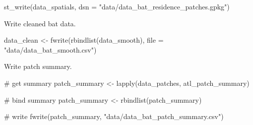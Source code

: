\documentclass[]{scrreprt}
\newenvironment{Shaded}{}{}
\newcommand{\CommentTok}[1]{\textcolor[rgb]{0.00,0.50,0.00}{#1}}
\newcommand{\DataTypeTok}[1]{#1}
\newcommand{\KeywordTok}[1]{\textcolor[rgb]{0.00,0.00,1.00}{#1}}
\newcommand{\NormalTok}[1]{#1}
\newcommand{\StringTok}[1]{\textcolor[rgb]{0.00,0.50,0.50}{#1}}
\begin{document}
\begin{Shaded}
\begin{Highlighting}[]
\KeywordTok{st_write}\NormalTok{(data_spatials,}
         \DataTypeTok{dsn =} \StringTok{"data/data_bat_residence_patches.gpkg"}\NormalTok{)}
\end{Highlighting}
\end{Shaded}

Write cleaned bat data.

\begin{Shaded}
\begin{Highlighting}[]
\NormalTok{data_clean <-}\StringTok{ }\KeywordTok{fwrite}\NormalTok{(}\KeywordTok{rbindlist}\NormalTok{(data_smooth),}
                     \DataTypeTok{file =} \StringTok{"data/data_bat_smooth.csv"}\NormalTok{)}
\end{Highlighting}
\end{Shaded}

Write patch summary.

\begin{Shaded}
\begin{Highlighting}[]
\CommentTok{# get summary}
\NormalTok{patch_summary <-}\StringTok{ }\KeywordTok{lapply}\NormalTok{(data_patches, atl_patch_summary)}

\CommentTok{# bind summary}
\NormalTok{patch_summary <-}\StringTok{ }\KeywordTok{rbindlist}\NormalTok{(patch_summary)}

\CommentTok{# write}
\KeywordTok{fwrite}\NormalTok{(patch_summary,}
       \StringTok{"data/data_bat_patch_summary.csv"}\NormalTok{)}
\end{Highlighting}
\end{Shaded}
\end{document}
